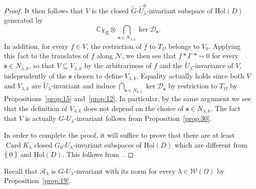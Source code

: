 \documentclass[10.5pt,reqno]{amsart}
\DeclareMathOperator{\card}{Card}
\newcommand{\Hol}{\mathrm{Hol}}
\newcommand{\vect}[1]{\mathbf{{#1}}}
\newcommand{\C}{\mathds{C}}
\newcommand{\Ac}{\mathcal{A}}
\newcommand{\Dc}{\mathcal{D}}
\newcommand{\Nc}{\mathcal{N}}
\newcommand{\Wc}{\mathcal{W}}
\begin{document}
\begin{proof}
	It then follows that $V$ is the closed $\widetilde G$-$\widetilde U^0_\lambda$-invariant  subspace of $\Hol(D)$ generated by
	\[
	\C \chi_E\otimes  \bigcap_{\vect s\in N_{\lambda,k}}\ker \Dc_{\vect s}.
	\]
	In addition, for every $f\in V$, the restriction of $f$ to $T_\Omega$ belongs to $V_0$. Applying this fact to the translates of $f$ along $\Nc$, we then see that $f* I^{-\vect s}=0$ for every $\vect s\in N_{\lambda,k}$, so that $V \subseteq V_{\lambda,k}$ by the arbitrariness of $f$ and the $\widetilde U_\lambda$-invariance of $V$, independently of   the $\vect s$ chosen to define $V_{\lambda,k}$. Equality actually holds since both $V$ and $V_{\lambda,k}$ are $\widetilde U_\lambda$-invariant and induce $\bigcap_{\vect s\in N_{k,\lambda}}\ker \Dc_{\vect s}$ by restriction to $T_\Omega$ by Propositions~\ref{prop:15} and~\ref{prop:12}. In particular, by the same argument we see that the definition of $V_{\lambda,k}$ does not depend on the choice of $\vect s\in N_{\lambda,k}$.
	The fact that $V$ is actually $G$-$U_\lambda$-invariant follows 	 from Proposition~\ref{prop:30}.	
	
	In order to complete the proof, it will suffice to prove that there are at least $\card{K_\lambda}$ closed $G_0$-$U_\lambda$-invariant subspaces of $\Hol(D)$ which  are different from $\Set{0}$ and $\Hol(D)$. This follows from~\cite[Theorem 5.3]{FarautKoranyi2}.	
\end{proof}

Recall that $\Ac_{\lambda}$ is $G$-$U_\lambda$-invariant with its norm for every $\lambda\in \Wc(\Omega)$ by Proposition~\ref{prop:19}.
\end{document}
